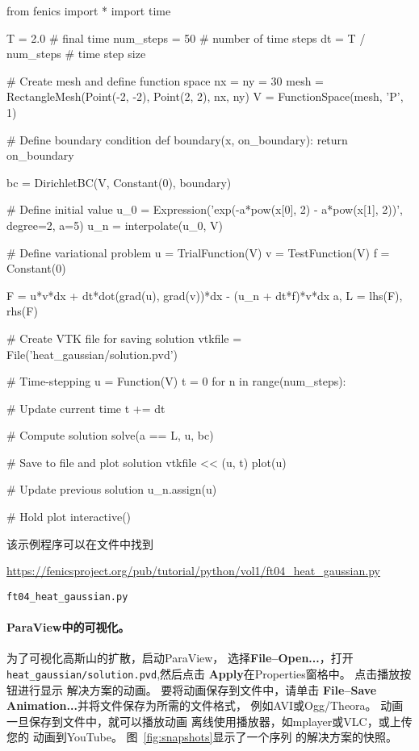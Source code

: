 \begin{python}
from fenics import *
import time

T = 2.0            # final time
num_steps = 50     # number of time steps
dt = T / num_steps # time step size

# Create mesh and define function space
nx = ny = 30
mesh = RectangleMesh(Point(-2, -2), Point(2, 2), nx, ny)
V = FunctionSpace(mesh, 'P', 1)

# Define boundary condition
def boundary(x, on_boundary):
    return on_boundary

bc = DirichletBC(V, Constant(0), boundary)

# Define initial value
u_0 = Expression('exp(-a*pow(x[0], 2) - a*pow(x[1], 2))',
                 degree=2, a=5)
u_n = interpolate(u_0, V)

# Define variational problem
u = TrialFunction(V)
v = TestFunction(V)
f = Constant(0)

F = u*v*dx + dt*dot(grad(u), grad(v))*dx - (u_n + dt*f)*v*dx
a, L = lhs(F), rhs(F)

# Create VTK file for saving solution
vtkfile = File('heat_gaussian/solution.pvd')

# Time-stepping
u = Function(V)
t = 0
for n in range(num_steps):

    # Update current time
    t += dt

    # Compute solution
    solve(a == L, u, bc)

    # Save to file and plot solution
    vtkfile << (u, t)
    plot(u)

    # Update previous solution
    u_n.assign(u)

# Hold plot
interactive()
\end{python}
该示例程序可以在文件中找到
\begin{center}
  \url{https://fenicsproject.org/pub/tutorial/python/vol1/ft04_heat_gaussian.py}
\end{center}
\begin{center}
  {\nolinkurl{ft04_heat_gaussian.py}}
\end{center}


\paragraph{ParaView中的可视化。}
为了可视化高斯山的扩散，启动ParaView，
选择\textbf{File--Open...}，打开
\verb!heat_gaussian/solution.pvd!,然后点击
\textbf{Apply}在Properties窗格中。 点击播放按钮进行显示
解决方案的动画。 要将动画保存到文件中，请单击
\textbf{File--Save Animation...}并将文件保存为所需的文件格式，
例如AVI或Ogg/Theora。
动画一旦保存到文件中，就可以播放动画
离线使用播放器，如mplayer或VLC，或上传您的
动画到YouTube。 图~\ref{fig:snapshots}显示了一个序列
的解决方案的快照。


